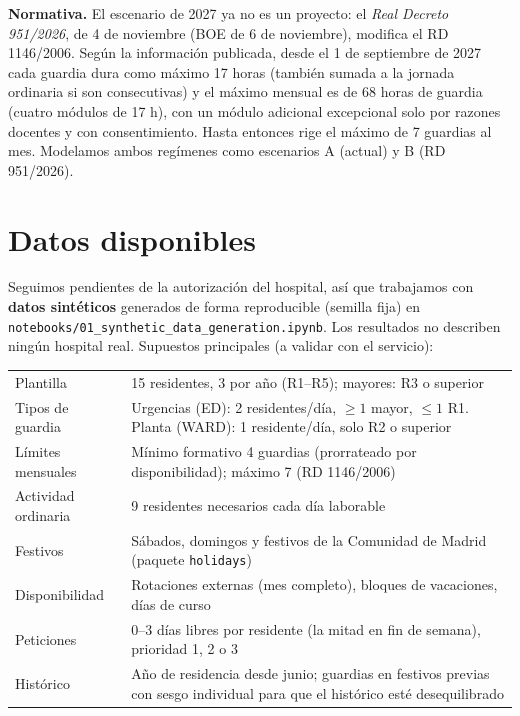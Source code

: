 \documentclass[10pt,a4paper]{article}
\begin{document}
\textbf{Normativa.} El escenario de 2027 ya no es un proyecto: el \emph{Real Decreto 951/2026}, de 4 de noviembre (BOE de 6 de noviembre), modifica el RD 1146/2006. Según la información publicada, desde el 1 de septiembre de 2027 cada guardia dura como máximo 17 horas (también sumada a la jornada ordinaria si son consecutivas) y el máximo mensual es de 68 horas de guardia (cuatro módulos de 17 h), con un módulo adicional excepcional solo por razones docentes y con consentimiento. Hasta entonces rige el máximo de 7 guardias al mes. Modelamos ambos regímenes como escenarios A (actual) y B (RD 951/2026).

\section{Datos disponibles}

Seguimos pendientes de la autorización del hospital, así que trabajamos con \textbf{datos sintéticos} generados de forma reproducible (semilla fija) en \texttt{notebooks/01\_synthetic\_data\_generation.ipynb}. Los resultados no describen ningún hospital real. Supuestos principales (a validar con el servicio):

\begin{center}\small
\begin{tabularx}{\linewidth}{@{}lX@{}}
\toprule
Plantilla & 15 residentes, 3 por año (R1--R5); mayores: R3 o superior \\
Tipos de guardia & Urgencias (ED): 2 residentes/día, $\geq 1$ mayor, $\leq 1$ R1. Planta (WARD): 1 residente/día, solo R2 o superior \\
Límites mensuales & Mínimo formativo 4 guardias (prorrateado por disponibilidad); máximo 7 (RD 1146/2006) \\
Actividad ordinaria & 9 residentes necesarios cada día laborable \\
Festivos & Sábados, domingos y festivos de la Comunidad de Madrid (paquete \texttt{holidays}) \\
Disponibilidad & Rotaciones externas (mes completo), bloques de vacaciones, días de curso \\
Peticiones & 0--3 días libres por residente (la mitad en fin de semana), prioridad 1, 2 o 3 \\
Histórico & Año de residencia desde junio; guardias en festivos previas con sesgo individual para que el histórico esté desequilibrado \\
\bottomrule
\end{tabularx}
\end{center}
\end{document}
